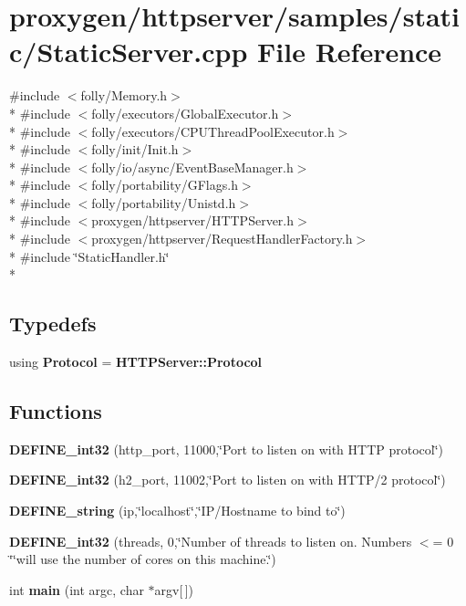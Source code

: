 \section{proxygen/httpserver/samples/static/\+Static\+Server.cpp File Reference}
\label{StaticServer_8cpp}
{\ttfamily \#include $<$folly/\+Memory.\+h$>$}\\*
{\ttfamily \#include $<$folly/executors/\+Global\+Executor.\+h$>$}\\*
{\ttfamily \#include $<$folly/executors/\+C\+P\+U\+Thread\+Pool\+Executor.\+h$>$}\\*
{\ttfamily \#include $<$folly/init/\+Init.\+h$>$}\\*
{\ttfamily \#include $<$folly/io/async/\+Event\+Base\+Manager.\+h$>$}\\*
{\ttfamily \#include $<$folly/portability/\+G\+Flags.\+h$>$}\\*
{\ttfamily \#include $<$folly/portability/\+Unistd.\+h$>$}\\*
{\ttfamily \#include $<$proxygen/httpserver/\+H\+T\+T\+P\+Server.\+h$>$}\\*
{\ttfamily \#include $<$proxygen/httpserver/\+Request\+Handler\+Factory.\+h$>$}\\*
{\ttfamily \#include \char`\"{}Static\+Handler.\+h\char`\"{}}\\*
\subsection*{Typedefs}
\begin{DoxyCompactItemize}
\item 
using {\bf Protocol} = {\bf H\+T\+T\+P\+Server\+::\+Protocol}
\end{DoxyCompactItemize}
\subsection*{Functions}
\begin{DoxyCompactItemize}
\item 
{\bf D\+E\+F\+I\+N\+E\+\_\+int32} (http\+\_\+port, 11000,\char`\"{}Port to listen on with H\+T\+TP protocol\char`\"{})
\item 
{\bf D\+E\+F\+I\+N\+E\+\_\+int32} (h2\+\_\+port, 11002,\char`\"{}Port to listen on with H\+T\+TP/2 protocol\char`\"{})
\item 
{\bf D\+E\+F\+I\+N\+E\+\_\+string} (ip,\char`\"{}localhost\char`\"{},\char`\"{}IP/Hostname to bind to\char`\"{})
\item 
{\bf D\+E\+F\+I\+N\+E\+\_\+int32} (threads, 0,\char`\"{}Number of threads to listen on. Numbers $<$= 0 \char`\"{}\char`\"{}will use the number of cores on this machine.\char`\"{})
\item 
int {\bf main} (int argc, char $\ast$argv[$\,$])
\end{DoxyCompactItemize}


